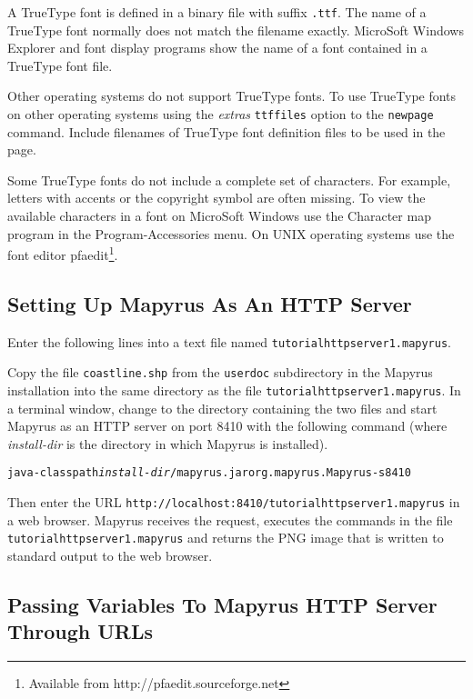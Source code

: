 A TrueType font is defined in a binary file with suffix
\texttt{.ttf}.
The name of a TrueType font normally does not match the filename exactly.
MicroSoft Windows Explorer and font display programs show the name of
a font contained in a TrueType font file.

Other operating systems do not support TrueType fonts.  To use TrueType fonts
on other operating systems using the \textit{extras} \texttt{ttffiles} option
to the \texttt{newpage} command.  Include filenames of TrueType font definition
files to be used in the page.

Some TrueType fonts do not include a complete set of characters.
For example, letters with accents or the copyright symbol are often
missing.  To view the available characters in a font on MicroSoft Windows
use the Character map program in the Program-Accessories
menu.  On UNIX operating systems use the font editor
pfaedit\footnote{Available from http://pfaedit.sourceforge.net}.

\subsection{Setting Up Mapyrus As An HTTP Server}
\label{tutorialhttpserver}

Enter the following lines into a text file named
\texttt{tutorialhttpserver1.mapyrus}.



Copy the file \texttt{coastline.shp} from the \texttt{userdoc}
subdirectory in the
Mapyrus installation into the same directory as the file
\texttt{tutorialhttpserver1.mapyrus}.  In a terminal window, change to the
directory containing the two files and start Mapyrus as an HTTP server on port
8410 with the following command
(where \textit{install-dir} is the directory in which Mapyrus is installed).

\begin{alltt}
java -classpath \textit{install-dir}/mapyrus.jar org.mapyrus.Mapyrus -s 8410
\end{alltt}

Then enter the URL \texttt{http://localhost:8410/tutorialhttpserver1.mapyrus} in a
web browser.  Mapyrus receives the request, executes the commands in the file
\texttt{tutorialhttpserver1.mapyrus} and returns the PNG image that is written to
standard output to the web browser.

\subsection{Passing Variables To Mapyrus HTTP Server Through URLs}
\label{urlvariables}

